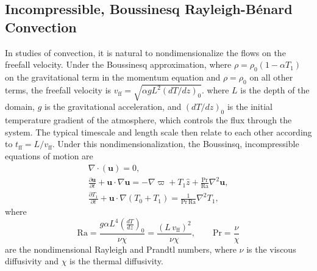 \documentclass[aps, pre, onecolumn, nofootinbib, notitlepage, groupedaddress, amsfonts, amssymb, amsmath, longbibliography]{revtex4-1}
\newcommand{\Div}[1]{\ensuremath{\nabla\cdot\left( #1\right)}}
\newcommand{\grad}{\ensuremath{\nabla}}
\newcommand{\RB}{Rayleigh-B\'{e}nard }
\begin{document}
\subsection{Incompressible, Boussinesq \RB Convection}
In studies of convection, it is natural to nondimensionalize the flows on the freefall velocity.
Under the Boussinesq approximation, where $\rho = \rho_0 (1 - \alpha T_1)$ on the gravitational term in the momentum
equation and $\rho = \rho_0$ on all other terms, the freefall velocity is $v_{\text{ff}} = \sqrt{\alpha g L^2 (dT/dz)_0}$.
where $L$ is the depth of the domain, $g$ is the gravitational acceleration, and $(dT/dz)_0$ is the initial temperature
gradient of the atmosphere, which controls the flux through the system.  The typical timescale and length scale
then relate to each other according to $t_{\text{ff}} = L/v_{\text{ff}}$.
Under this nondimensionalization, the Boussinsq, incompressible equations of motion are
\begin{gather}
\Div{\bm{u}} = 0, 
	\label{eqn:incompressible}
\\
\frac{\partial \bm{u}}{\partial t} + \bm{u}\cdot\grad\bm{u} =
-\grad\varpi + T_1\hat{z} + \frac{\text{Pr}}{\text{Ra}}\grad^2\bm{u}, 
	\label{eqn:bouss_momentum_eqn}
\\
\frac{\partial T_1}{\partial t} + \bm{u}\cdot\grad(T_0 + T_1) = \frac{1}{\text{Pr}\,\text{Ra}}\grad^2 T_1,
	\label{eqn:bouss_energy_eqn}
\end{gather}
where
\begin{equation}
\text{Ra} = \frac{g \alpha L^4 \left(\frac{dT}{dz}\right)_0}{\nu\chi} = \frac{(L\,v_{\text{ff}})^2}{\nu\chi}, \qquad \text{Pr} = \frac{\nu}{\chi}
\end{equation}
are the nondimensional Rayleigh and Prandtl numbers, where $\nu$ is the viscous diffusivity and $\chi$ is
the thermal diffusivity.
\end{document}

